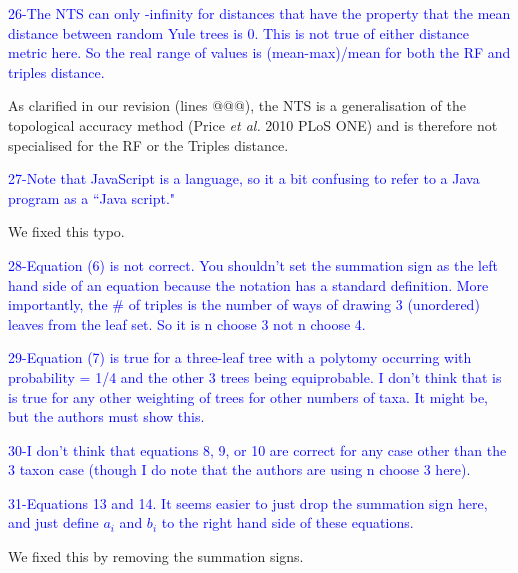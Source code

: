 \documentclass[11pt]{letter}
\begin{document}
\begin{letter}{}

\textcolor{blue}{26-The NTS can only -infinity for distances that have the property that the mean distance between random Yule trees is 0. This is not true of either distance metric here. So the real range of values is (mean-max)/mean for both the RF and triples distance.}

As clarified in our revision (lines @@@), the NTS is a generalisation of the topological accuracy method (Price \textit{et al.} 2010 PLoS ONE) and is therefore not specialised for the RF or the Triples distance.


\textcolor{blue}{27-Note that JavaScript is a language, so it a bit confusing to refer to a Java program as a ``Java script."}

We fixed this typo.


\textcolor{blue}{28-Equation (6) is not correct. You shouldn't set the summation sign as the left hand side of an equation because the notation has a standard definition. More importantly, the $\#$ of triples is the number of ways of drawing 3 (unordered) leaves from the leaf set. So it is n choose 3 not n choose 4.}



\textcolor{blue}{29-Equation (7) is true for a three-leaf tree with a polytomy occurring with probability = 1/4 and the other 3 trees being equiprobable. I don't think that is is true for any other weighting of trees for other numbers of taxa. It might be, but the authors must show this.}



\textcolor{blue}{30-I don't think that equations 8, 9, or 10 are correct for any case other than the 3 taxon case (though I do note that the authors are using n choose 3 here).}



\textcolor{blue}{31-Equations 13 and 14. It seems easier to just drop the summation sign here, and just define $a_i$ and $b_i$ to the right hand side of these equations.}

We fixed this by removing the summation signs.


\end{letter}
\end{document}
